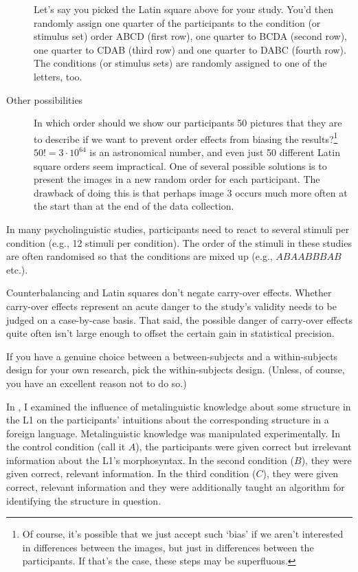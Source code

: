 \documentclass[a4paper]{tufte-book}\usepackage[]{graphicx}\usepackage[]{xcolor}
\begin{document}
\begin{description}
  Let's say you picked the Latin square above for your study.
  You'd then randomly assign one quarter of the participants to
  the condition (or stimulus set) order ABCD (first row), 
  one quarter to BCDA (second row),
  one quarter to CDAB (third row) and one quarter to DABC (fourth row).
  The conditions (or stimulus sets) are randomly
  assigned to one of the letters, too.
  
\item[Other possibilities] In which order should we show our
participants 50 pictures that they are to describe if we want to 
prevent order effects from biasing the results?\footnote{Of course,
it's possible that we just accept such `bias' if we aren't interested
in differences between the images, but just in differences between
the participants. If that's the case, these steps may be superfluous.} 
$50! = 3 \cdot 10^{64}$ is an astronomical number,
and even just 50 different Latin square orders seem impractical. One of several
possible solutions is to present the images in a new random order for each participant.
The drawback of doing this is that perhaps image 3 occurs much more often at the start than at the
end of the data collection.
\end{description}

In many psycholinguistic studies, participants need to react
to several stimuli per condition (e.g., 12 stimuli per condition).
The order of the stimuli in these studies are often randomised
so that the conditions are mixed up (e.g., $ABAABBBAB$ etc.).

Counterbalancing and Latin squares don't negate carry-over effects.
Whether carry-over effects represent an acute danger to the study's
validity needs to be judged on a case-by-case basis.
That said, the possible danger of carry-over effects quite often isn't
large enough to offset the certain gain in statistical precision.

\begin{framed}
If you have a genuine choice between a between-subjects
and a within-subjects design for your own research, pick the 
within-subjects design. (Unless, of course, you have an excellent
reason not to do so.)
\end{framed}

  In \citet{Vanhove2018}, I examined the influence of metalinguistic knowledge
  about some structure in the L1 on the participants' intuitions about 
  the corresponding structure in a foreign language.
  Metalinguistic knowledge was manipulated experimentally.
  In the control condition (call it $A$), the participants were 
  given correct but irrelevant information about the L1's morphosyntax.
  In the second condition ($B$), they were given correct, relevant information.
  In the third condition ($C$), they were given correct, relevant information
  and they were additionally taught an algorithm for identifying the structure in question.
  
\end{document}
